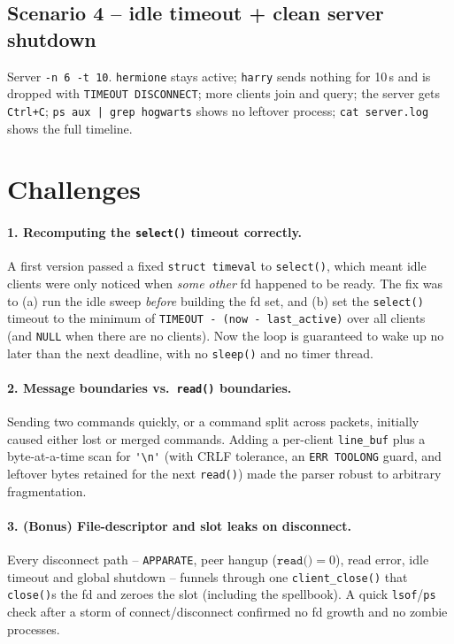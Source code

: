 \documentclass[11pt,a4paper]{article}
\begin{document}
\subsection{Scenario 4 -- idle timeout + clean server shutdown}
Server \texttt{-n 6 -t 10}. \texttt{hermione} stays active; \texttt{harry} sends
nothing for 10\,s and is dropped with \texttt{TIMEOUT DISCONNECT}; more clients
join and query; the server gets \texttt{Ctrl+C}; \texttt{ps aux | grep hogwarts}
shows no leftover process; \texttt{cat server.log} shows the full timeline.
  
  

\section{Challenges}

\paragraph{1. Recomputing the \texttt{select()} timeout correctly.}
A first version passed a fixed \texttt{struct timeval} to \texttt{select()}, which
meant idle clients were only noticed when \emph{some other} fd happened to be
ready. The fix was to (a) run the idle sweep \emph{before} building the fd set,
and (b) set the \texttt{select()} timeout to the minimum of
\texttt{TIMEOUT - (now - last\_active)} over all clients (and \texttt{NULL} when
there are no clients). Now the loop is guaranteed to wake up no later than the
next deadline, with no \texttt{sleep()} and no timer thread.

\paragraph{2. Message boundaries vs.\ \texttt{read()} boundaries.}
Sending two commands quickly, or a command split across packets, initially caused
either lost or merged commands. Adding a per-client \texttt{line\_buf} plus a
byte-at-a-time scan for \verb|'\n'| (with CRLF tolerance, an \texttt{ERR TOOLONG}
guard, and leftover bytes retained for the next \texttt{read()}) made the parser
robust to arbitrary fragmentation.

\paragraph{3. (Bonus) File-descriptor and slot leaks on disconnect.}
Every disconnect path -- \texttt{APPARATE}, peer hangup ($\texttt{read()} = 0$),
read error, idle timeout and global shutdown -- funnels through one
\texttt{client\_close()} that \texttt{close()}s the fd and zeroes the slot
(including the spellbook). A quick \texttt{lsof}/\texttt{ps} check after a
storm of connect/disconnect confirmed no fd growth and no zombie processes.
\end{document}
